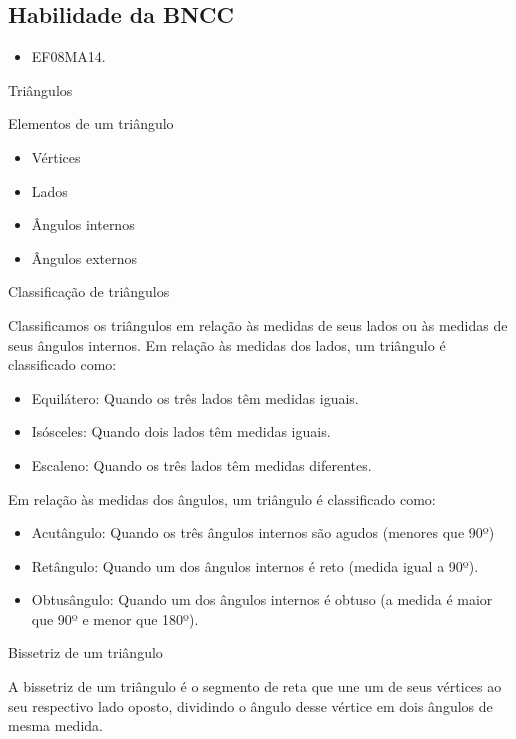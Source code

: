 {\subsection{Habilidade da BNCC}

\begin{itemize}
\item EF08MA14.
\end{itemize}

Triângulos

Elementos de um triângulo

\begin{itemize}
\item
  Vértices
\item
  Lados
\item
  Ângulos internos
\item
  Ângulos externos
\end{itemize}

Classificação de triângulos

Classificamos os triângulos em relação às medidas de seus lados ou às
medidas de seus ângulos internos. Em relação às medidas dos lados, um
triângulo é classificado como:

\begin{itemize}
\item
  Equilátero: Quando os três lados têm medidas iguais.
\item
  Isósceles: Quando dois lados têm medidas iguais.
\item
  Escaleno: Quando os três lados têm medidas diferentes.
\end{itemize}

Em relação às medidas dos ângulos, um triângulo é classificado como:

\begin{itemize}
\item
  Acutângulo: Quando os três ângulos internos são agudos (menores que
  90º)
\item
  Retângulo: Quando um dos ângulos internos é reto (medida igual a 90º).
\item
  Obtusângulo: Quando um dos ângulos internos é obtuso (a medida é maior
  que 90º e menor que 180º).
\end{itemize}

Bissetriz de um triângulo

A bissetriz de um triângulo é o segmento de reta que une um de seus
vértices ao seu respectivo lado oposto, dividindo o ângulo desse vértice
em dois ângulos de mesma medida.

}
